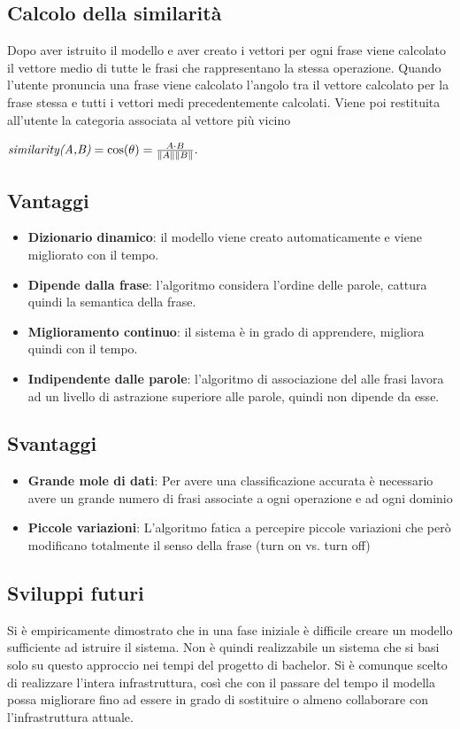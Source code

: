 \documentclass[twoside]{supsistudent}
\begin{document}
\subsection{Calcolo della similarità}
Dopo aver istruito il modello e aver creato i vettori per ogni frase viene calcolato il vettore medio di tutte le frasi che rappresentano la stessa operazione. Quando l'utente pronuncia una frase viene calcolato l'angolo tra il vettore calcolato per la frase stessa e tutti i vettori medi precedentemente calcolati. Viene poi restituita all'utente la categoria associata al vettore più vicino
\begin{center}
\begin{math}
 \textit{similarity(A,B)} = \cos(\theta) = {A \cdot B \over \|A\| \|B\|}.
 \end{math}
 \end{center}
\subsection{Vantaggi}
\begin{itemize}
  \item \textbf{Dizionario dinamico}: il modello viene creato automaticamente e viene migliorato con il tempo.
  \item \textbf{Dipende dalla frase}: l'algoritmo considera l'ordine delle parole, cattura quindi la semantica della frase.
  \item \textbf{Miglioramento continuo}: il sistema è in grado di apprendere, migliora quindi con il tempo.
  \item \textbf{Indipendente dalle parole}: l'algoritmo di associazione del alle frasi lavora ad un livello di astrazione superiore alle parole, quindi non dipende da esse.
\end{itemize}
\subsection{Svantaggi}
\begin{itemize}
  \item \textbf{Grande mole di dati}: Per avere una classificazione accurata è necessario avere un grande numero di frasi associate a ogni operazione e ad ogni dominio
  \item \textbf{Piccole variazioni}: L'algoritmo fatica a percepire piccole variazioni che però modificano totalmente il senso della frase (turn on vs. turn off)
\end{itemize}
\subsection{Sviluppi futuri}
Si è empiricamente dimostrato che in una fase iniziale è difficile creare un modello sufficiente ad istruire il sistema. Non è quindi realizzabile un sistema che si basi solo su questo approccio nei tempi del progetto di bachelor. Si è comunque scelto di realizzare l'intera infrastruttura, così che con il passare del tempo il modella possa migliorare fino ad essere in grado di sostituire o almeno collaborare con l'infrastruttura attuale.
\newpage
\end{document}
